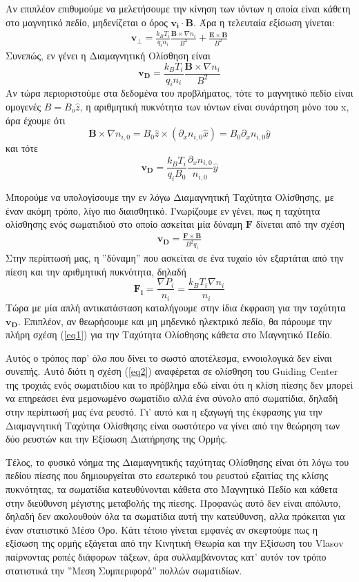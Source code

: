 \documentclass[a4paper]{article}
\begin{document}
	 Αν επιπλέον επιθυμούμε να μελετήσουμε την κίνηση των ιόντων η οποία είναι κάθετη στο μαγνητικό πεδίο, μηδενίζεται ο όρος $\bm{v_i}\cdot\bm{B}$.
	 Άρα η τελευταία εξίσωση γίνεται: 
	 	\begin{align}\label{eq1}
	 		\bm{v_{\perp}} = \frac{k_BT_i}{q_in_i}\frac{\bm{B}\times\nabla n_i}{B^2} + \frac{\bm{E}\times\bm{B}}{B^2}
	 	\end{align}
	 Συνεπώς, εν γένει η Διαμαγνητική Ολίσθηση είναι $$\bm{v_{D}}= 	 \frac{k_BT_i}{q_in_i}\frac{\bm{B}\times\nabla n_i}{B^2}$$
	 Αν τώρα περιοριστούμε στα δεδομένα του προβλήματος, τότε το μαγνητικό πεδίο είναι ομογενές $B = B_o\hat{z}$, η αριθμητική πυκνότητα των ιόντων είναι συνάρτηση μόνο του x, 			άρα έχουμε ότι 
	 		$$\bm{B}\times\nabla n_{i,0} = B_0 \hat{z} \times(\partial_x n_{i,0} \hat{x}) = B_0\partial_xn_{i,0}\hat{y}$$
	 		και τότε 
	 		$$\bm{v_D} = \frac{k_BT_i}{q_iB_0}\frac{\partial_xn_{i,0}}{n_{i,0}}\hat{y}$$
	 		
	 Μπορούμε να υπολογίσουμε την εν λόγω Διαμαγνητική Ταχύτητα Ολίσθησης, με έναν ακόμη τρόπο, λίγο πιο διαισθητικό. Γνωρίζουμε εν γένει, πως η ταχύτητα ολίσθησης ενός σωματιδιού στο οποίο ασκείται μία δύναμη $\bm{F}$ δίνεται από την σχέση 
	 		\begin{align}\label{eq2}
	 			\bm{v_D} = \frac{\bm{F}\times\bm{B}}{B^2q_i} 
	 		\end{align}
	 Στην περίπτωσή μας, η ''δύναμη'' που ασκείται σε ένα τυχαίο ιόν εξαρτάται από την πίεση και την αριθμητική πυκνότητα, δηλαδή $$\bm{F_i} = \frac{\nabla P_i}{n_i}=\frac{k_BT_i\nabla n_i}{n_i}$$
	 Τώρα με μία απλή αντικατάσταση καταλήγουμε στην ίδια έκφραση για την ταχύτητα $\bm{v_D}$. Επιπλέον, αν θεωρήσουμε και μη μηδενικό ηλεκτρικό πεδίο, θα πάρουμε την πλήρη σχέση (\ref{eq1}) για την Ταχύτητα Ολίσθησης κάθετα στο Μαγνητικό Πεδίο.
	 
	  Αυτός ο τρόπος παρ' όλο που δίνει το σωστό αποτέλεσμα, εννοιολογικά δεν είναι συνεπής. Αυτό διότι η σχέση (\ref{eq2}) αναφέρεται σε ολίσθηση του Guiding Center της τροχιάς ενός σωματιδίου και το πρόβλημα εδώ είναι ότι η κλίση πίεσης δεν μπορεί να επηρεάσει ένα μεμονωμένο σωματίδιο αλλά ένα σύνολο από σωματίδια, δηλαδή στην περίπτωσή μας ένα ρευστό. Γι' αυτό και η εξαγωγή της έκφρασης για την Διαμαγνητική Ταχύτηα Ολίσθησης είναι σωστότερο να γίνει από την θεώρηση των δύο ρευστών και την Εξίσωση Διατήρησης της Ορμής.
	  
	  Τέλος, το φυσικό νόημα της Διαμαγνητικής ταχύτητας Ολίσθησης είναι ότι λόγω του πεδίου πίεσης που δημιουργείται στο εσωτερικό του ρευστού εξαιτίας της κλίσης πυκνότητας, τα σωματίδια κατευθύνονται κάθετα στο Μαγνητικό Πεδίο και κάθετα στην διεύθυνση μέγιστης μεταβολής της πίεσης. Προφανώς αυτό δεν είναι απόλυτο, δηλαδή δεν ακολουθούν όλα τα σωματίδια αυτή την κατεύθυνση, αλλα πρόκειται για έναν στατιστικό Μέσο Όρο. 
	  Κάτι τέτοιο γίνεται εμφανές αν σκεφτούμε πως η εξίσωση της ορμής εξάγεται από την Κινητική Θεωρία και την Εξίσωση του Vlasov παίρνοντας ροπές διάφορων τάξεων, άρα συλλαμβάνοντας κατ' αυτόν τον τρόπο στατιστικά την ''Μεση Συμπεριφορά'' πολλών σωματιδίων.
	  
\end{document}
